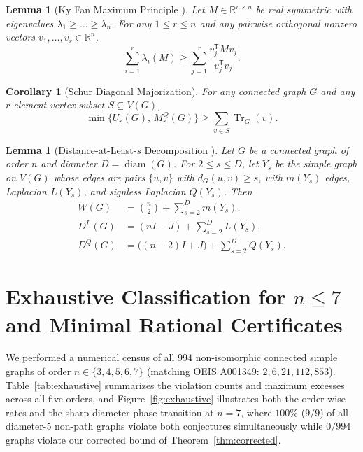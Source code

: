 \documentclass[11pt,a4paper]{article}
\newtheorem{lemma}[theorem]{Lemma}
\newtheorem{corollary}[theorem]{Corollary}
\theoremstyle{remark}
\DeclareMathOperator{\Tr}{Tr}
\DeclareMathOperator{\diam}{diam}
\begin{document}
\begin{lemma}[Ky Fan Maximum Principle \cite{Fan1949}]\label{lem:kyfan}
Let $M \in \mathbb{R}^{n \times n}$ be real symmetric with eigenvalues $\lambda_1 \ge \dots \ge \lambda_n$. For any $1 \le r \le n$ and any pairwise orthogonal nonzero vectors $v_1, \dots, v_r \in \mathbb{R}^n$,
\[
\sum_{i=1}^{r} \lambda_i(M) \ge \sum_{j=1}^{r} \frac{v_j^{\mathsf{T}} M v_j}{v_j^{\mathsf{T}} v_j}.
\]
\end{lemma}

\begin{corollary}[Schur Diagonal Majorization]\label{cor:schur}
For any connected graph $G$ and any $r$-element vertex subset $S \subseteq V(G)$,
\[
\min\bigl\{U_r(G),\, M_r^Q(G)\bigr\} \ge \sum_{v \in S} \Tr_G(v).
\]
\end{corollary}

\begin{lemma}[Distance-at-Least-$s$ Decomposition \cite{Huang2026}]\label{lem:decomp}
Let $G$ be a connected graph of order $n$ and diameter $D = \diam(G)$. For $2 \le s \le D$, let $Y_s$ be the simple graph on $V(G)$ whose edges are pairs $\{u,v\}$ with $d_G(u,v) \ge s$, with $m(Y_s)$ edges, Laplacian $L(Y_s)$, and signless Laplacian $Q(Y_s)$. Then
\begin{align}
W(G) &= \binom{n}{2} + \sum_{s=2}^{D} m(Y_s), \label{eq:W-decomp}\\
D^L(G) &= (nI - J) + \sum_{s=2}^{D} L(Y_s), \label{eq:DL-decomp}\\
D^Q(G) &= \bigl((n-2)I + J\bigr) + \sum_{s=2}^{D} Q(Y_s). \label{eq:DQ-decomp}
\end{align}
\end{lemma}

\section{Exhaustive Classification for $n \le 7$ and Minimal Rational Certificates}
We performed a numerical census of all $994$ non-isomorphic connected simple graphs of order $n \in \{3, 4, 5, 6, 7\}$ (matching OEIS A001349: $2, 6, 21, 112, 853$). Table~\ref{tab:exhaustive} summarizes the violation counts and maximum excesses across all five orders, and Figure~\ref{fig:exhaustive} illustrates both the order-wise rates and the sharp diameter phase transition at $n = 7$, where $100\%$ ($9/9$) of all diameter-$5$ non-path graphs violate both conjectures simultaneously while $0/994$ graphs violate our corrected bound of Theorem~\ref{thm:corrected}.
\end{document}

